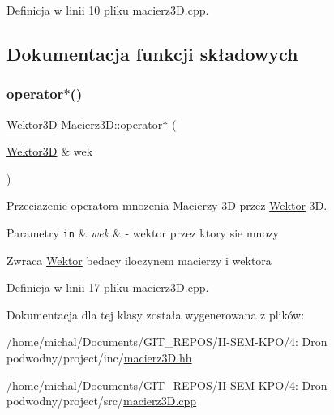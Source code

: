 Definicja w linii 10 pliku macierz3\+D.\+cpp.



\subsection{Dokumentacja funkcji składowych}
\mbox{\label{class_macierz3_d_a3896e21fc7cf77a172c413738c5fccbd}} 
\subsubsection{\texorpdfstring{operator$\ast$()}{operator*()}}
{\footnotesize\ttfamily \hyperlink{class_wektor3_d}{Wektor3D} Macierz3\+D\+::operator$\ast$ (\begin{DoxyParamCaption}\item[{\hyperlink{class_wektor3_d}{Wektor3D} \&}]{wek }\end{DoxyParamCaption})}



Przeciazenie operatora mnozenia Macierzy 3D przez \hyperlink{class_wektor}{Wektor} 3D. 


\begin{DoxyParams}[1]{Parametry}
\mbox{\tt in}  & {\em wek} & -\/ wektor przez ktory sie mnozy \\
\hline
\end{DoxyParams}
\begin{DoxyReturn}{Zwraca}
\hyperlink{class_wektor}{Wektor} bedacy iloczynem macierzy i wektora 
\end{DoxyReturn}


Definicja w linii 17 pliku macierz3\+D.\+cpp.



Dokumentacja dla tej klasy została wygenerowana z plików\+:\begin{DoxyCompactItemize}
\item 
/home/michal/\+Documents/\+G\+I\+T\+\_\+\+R\+E\+P\+O\+S/\+I\+I-\/\+S\+E\+M-\/\+K\+P\+O/4\+: Dron podwodny/project/inc/\hyperlink{macierz3_d_8hh}{macierz3\+D.\+hh}\item 
/home/michal/\+Documents/\+G\+I\+T\+\_\+\+R\+E\+P\+O\+S/\+I\+I-\/\+S\+E\+M-\/\+K\+P\+O/4\+: Dron podwodny/project/src/\hyperlink{macierz3_d_8cpp}{macierz3\+D.\+cpp}\end{DoxyCompactItemize}
